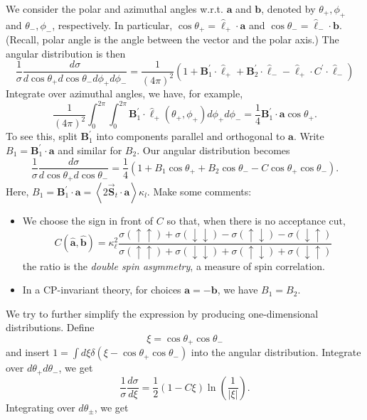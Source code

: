 We consider the polar and azimuthal angles w.r.t. $\mathbf{a}$ and $\mathbf{b}$, denoted by $\theta_+, \phi_+$ and $\theta_-, \phi_-$, respectively. In particular, $\cos \theta_+ = \hat{\ell}_+ \cdot \mathbf{a}$ and $\cos \theta_- = \hat{\ell}_- \cdot \mathbf{b}$.
(Recall, polar angle is the angle between the vector and the polar axis.) The angular distribution is then
\[
\frac{1}{\sigma} \frac{d \sigma}{d \cos \theta_+ d\cos\theta_- d \phi_+ d \phi_-}=\frac{1}{(4 \pi)^2}\left(1+\mathbf{B}_1^{\prime} \cdot \hat{\ell}_{+}+\mathbf{B}_2^{\prime} \cdot \hat{\ell}_{-}-\hat{\ell}_{+} \cdot C^{\prime} \cdot \hat{\ell}_{-}\right)
\]
Integrate over azimuthal angles, we have, for example,
\[
    \frac{1}{(4 \pi)^2}\int_0^{2 \pi} \int_0^{2 \pi}\mathbf{B}_1^{\prime} \cdot \hat{\ell}_{+}( \theta_+, \phi_+) d \phi_+ d \phi_- 
    = \frac{1}{4} \mathbf{B}_1^{\prime} \cdot \mathbf{a} \cos \theta_+.
\]
To see this, split $\mathbf{B}_1^{\prime}$ into components parallel and orthogonal to $\mathbf{a}$. Write $B_1 = \mathbf{B}_1^{\prime} \cdot \mathbf{a}$ and similar for $B_2$. Our angular distribution becomes
\[
\frac{1}{\sigma} \frac{d \sigma}{d \cos \theta_{+} d \cos \theta_{-}}=\frac{1}{4}\left(1+B_1 \cos \theta_{+}+B_2 \cos \theta_{-}-C \cos \theta_{+} \cos \theta_{-}\right) .
\]
Here, $B_1 = \mathbf{B}_1^{\prime} \cdot \mathbf{a} =\left\langle 2 \vec{\mathbf{S}}_t \cdot \mathbf{a}\right\rangle \kappa_l $. Make some comments:
\begin{itemize}
    \item We choose the sign in front of $C$ so that, when there is no acceptance cut,
    \[
C(\hat{\mathbf{a}}, \hat{\mathbf{b}})=\kappa_{\ell}^2 \frac{\sigma(\uparrow \uparrow)+\sigma(\downarrow \downarrow)-\sigma(\uparrow \downarrow)-\sigma(\downarrow \uparrow)}{\sigma(\uparrow \uparrow)+\sigma(\downarrow \downarrow)+\sigma(\uparrow \downarrow)+\sigma(\downarrow \uparrow)}
\]
    the ratio is the \textit{double spin asymmetry}, a measure of spin correlation.
    \item In a CP-invariant theory, for choices $\mathbf{a} = - \mathbf{b}$, we have $B_1 = B_2$.
\end{itemize}
We try to further simplify the expression by producing one-dimensional distributions. Define
\[
\xi=\cos \theta_{+} \cos \theta_{-}
\]
and insert $1=\int d \xi \delta\left(\xi-\cos \theta_{+} \cos \theta_{-}\right)$ into the angular distribution. Integrate over $d\theta_+ d\theta_-$, we get
\[
\frac{1}{\sigma} \frac{d \sigma}{d \xi}=\frac{1}{2}(1-C \xi) \ln \left(\frac{1}{|\xi|}\right).
\]
Integrating over $d\theta_\pm$, we get
